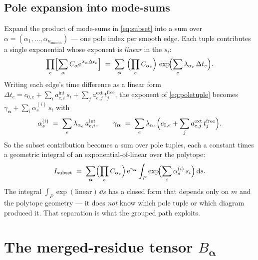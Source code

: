 \subsection{Pole expansion into mode-sums}

Expand the product of mode-sums in \eqref{eq:subset} into a sum over  $\alpha = (\alpha_1, \dots, \alpha_{n_{\text{smooth}}})$ --- one pole
index per smooth edge. Each tuple contributes a single exponential whose exponent
is \emph{linear} in the $s_i$:
\begin{equation}
  \prod_e \Bigl[\sum_\alpha C_\alpha \mathrm{e}^{\lambda_\alpha \Delta t_e}\Bigr]
  \;=\;
  \sum_{\bm\alpha}\ \Bigl(\prod_e C_{\alpha_e}\Bigr)\,
  \exp\!\Bigl(\sum_e \lambda_{\alpha_e}\,\Delta t_e\Bigr) .
  \label{eq:poletuple}
\end{equation}
Writing each edge's time difference as a linear form
$\Delta t_e = c_{0,e} + \sum_i a^{\text{int}}_{e,i}\,s_i + \sum_j a^{\text{ext}}_{e,j}\,t^{\text{free}}_j$,
the exponent of \eqref{eq:poletuple} becomes $\gamma_{\bm\alpha} + \sum_i
\alpha^{(i)}_s\,s_i$ with
\begin{equation}
  \alpha^{(i)}_s \;=\; \sum_e \lambda_{\alpha_e}\,a^{\text{int}}_{e,i},
  \qquad
  \gamma_{\bm\alpha} \;=\; \sum_e \lambda_{\alpha_e}\Bigl(c_{0,e} + \sum_j a^{\text{ext}}_{e,j}\,t^{\text{free}}_j\Bigr).
  \label{eq:slopes}
\end{equation}
So the subset contribution becomes a sum over pole tuples, each a constant times
a geometric integral of an exponential-of-linear over the polytope:
\begin{equation}
  I_{\text{subset}}
  \;=\;
  \sum_{\bm\alpha}\Bigl(\prod_e C_{\alpha_e}\Bigr)\,\mathrm{e}^{\gamma_{\bm\alpha}}
  \int_P \exp\!\Bigl(\sum_i \alpha^{(i)}_s\,s_i\Bigr)\,\mathrm{d} s .
  \label{eq:subsetfinal}
\end{equation}
The integral $\int_P \exp(\text{linear})\,\dd s$ has a closed form that depends
only on $m$ and the polytope geometry --- it does \emph{not} know which pole tuple
or which diagram produced it. That separation is what the grouped path exploits.

\section{The merged-residue tensor \texorpdfstring{$B_{\bm\alpha}$}{B-alpha}}

